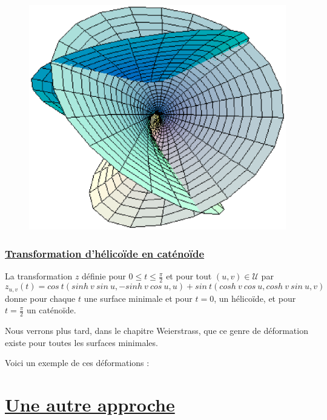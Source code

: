 \documentclass {report}
\begin{document}
\begin{figure}[h!]
      \centering 
      \includegraphics[scale=0.5]{Images_Fichiers/5.eps}
\end{figure}


\subsubsection[Transformation d'hélicoïde en caténoïde]{\uline{Transformation d'hélicoïde en caténoïde}}

La transformation $z$ définie pour $0\leq t \leq \frac{\pi}{2}$ et pour tout $(u,v)\in\mathscr{U}$ par $$z_{u,v}(t) = cos\ t(sinh\ v\ sin\ u, -sinh\ v\ cos\ u, u)+sin\ t(cosh\ v\ cos\ u, cosh\ v\ sin\ u, v)$$ donne pour chaque $t$ une surface minimale et pour $t=0$, un hélicoïde, et pour $t=\frac{\pi}{2}$ un caténoïde. 

Nous verrons plus tard, dans le chapitre Weierstrass, que ce genre de déformation existe pour toutes les surfaces minimales.

Voici un exemple de ces déformations :\\
\begin{center}
\end{center}

\section[Une autre approche]{\uline{Une autre approche}}
\end{document}
